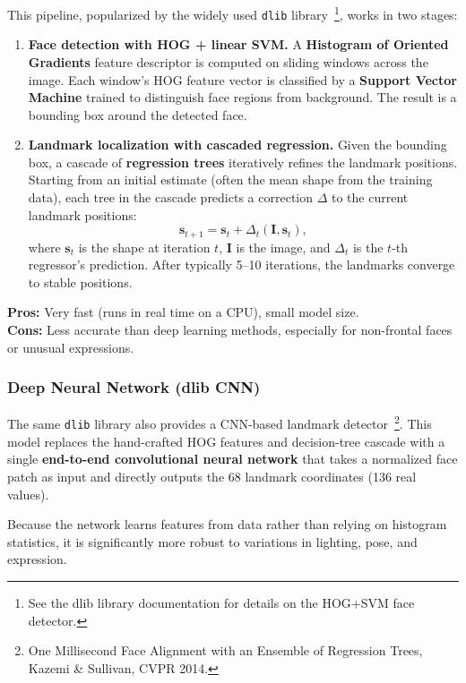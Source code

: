 This pipeline, popularized by the widely used \texttt{dlib} library~\footnote{See the dlib library documentation for details on the HOG+SVM face detector.}, works in two stages:

\begin{enumerate}
    \item \textbf{Face detection with HOG + linear SVM.} A \textbf{Histogram of Oriented Gradients} feature descriptor is computed on sliding windows across the image. Each window's HOG feature vector is classified by a \textbf{Support Vector Machine} trained to distinguish face regions from background. The result is a bounding box around the detected face.
    \item \textbf{Landmark localization with cascaded regression.} Given the bounding box, a cascade of \textbf{regression trees} iteratively refines the landmark positions. Starting from an initial estimate (often the mean shape from the training data), each tree in the cascade predicts a correction $\Delta$ to the current landmark positions:
    \begin{equation}
        \mathbf{s}_{t+1} = \mathbf{s}_t + \Delta_t(\mathbf{I}, \mathbf{s}_t),
    \end{equation}
    where $\mathbf{s}_t$ is the shape at iteration $t$, $\mathbf{I}$ is the image, and $\Delta_t$ is the $t$-th regressor's prediction. After typically 5--10 iterations, the landmarks converge to stable positions.
\end{enumerate}

\textbf{Pros:} Very fast (runs in real time on a CPU), small model size. \\
\textbf{Cons:} Less accurate than deep learning methods, especially for non-frontal faces or unusual expressions.

\subsubsection*{Deep Neural Network (dlib CNN)}

The same \texttt{dlib} library also provides a CNN-based landmark detector~\footnote{One Millisecond Face Alignment with an Ensemble of Regression Trees, Kazemi \& Sullivan, CVPR 2014.}. This model replaces the hand-crafted HOG features and decision-tree cascade with a single \textbf{end-to-end convolutional neural network} that takes a normalized face patch as input and directly outputs the 68 landmark coordinates (136 real values).

Because the network learns features from data rather than relying on histogram statistics, it is significantly more robust to variations in lighting, pose, and expression.

